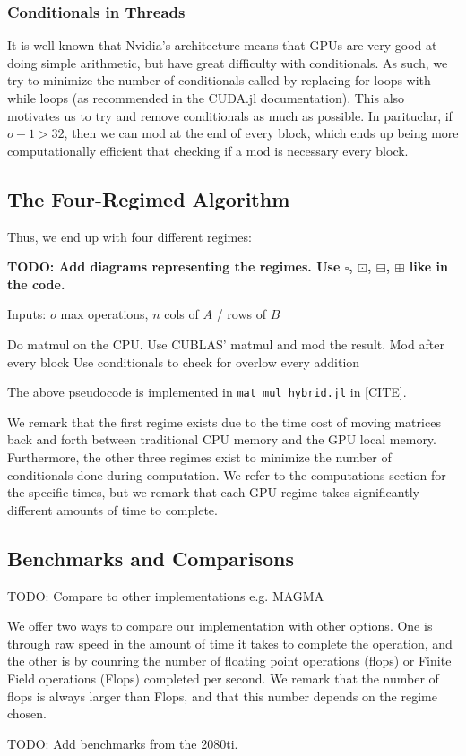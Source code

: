 \subsubsection{Conditionals in Threads}

It is well known that Nvidia's architecture means that GPUs are very good at doing simple arithmetic, but have great difficulty with conditionals. As such, we try to minimize the number of conditionals called by replacing for loops with while loops (as recommended in the CUDA.jl documentation). This also motivates us to try and remove conditionals as much as possible. In parituclar, if $o - 1 > 32$, then we can mod at the end of every block, which ends up being more computationally efficient that checking if a mod is necessary every block.

\subsection{The Four-Regimed Algorithm}

Thus, we end up with four different regimes:

\textbf{TODO: Add diagrams representing the regimes. Use $\square$, $\boxdot$, $\boxminus$, $\boxplus$ like in the code.}

\begin{alg}
    Inputs: $o$ max operations, $n$ cols of $A$ / rows of $B$
    \begin{algorithmic}
            \State Do matmul on the CPU.
            \State Use CUBLAS' matmul and mod the result.
            \State Mod after every block
        \Else
            \State Use conditionals to check for overlow every addition
        \EndIf
    \end{algorithmic}
\end{alg}
The above pseudocode is implemented in \texttt{mat\_mul\_hybrid.jl} in [CITE].

We remark that the first regime exists due to the time cost of moving matrices back and forth between traditional CPU memory and the GPU local memory. Furthermore, the other three regimes exist to minimize the number of conditionals done during computation. We refer to the computations section for the specific times, but we remark that each GPU regime takes significantly different amounts of time to complete.

\subsection{Benchmarks and Comparisons}

TODO: Compare to other implementations e.g. MAGMA

We offer two ways to compare our implementation with other options. One is through raw speed in the amount of time it takes to complete the operation, and the other is by counring the number of floating point operations (flops) or Finite Field operations (Flops) completed per second. We remark that the number of flops is always larger than Flops, and that this number depends on the regime chosen.

TODO: Add benchmarks from the 2080ti.